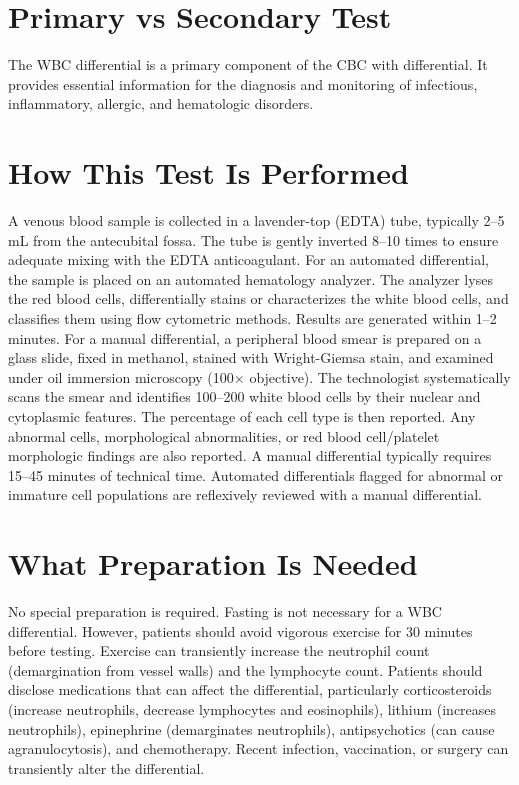 \section*{Primary vs Secondary Test}
The WBC differential is a primary component of the CBC with differential. It provides essential information for the diagnosis and monitoring of infectious, inflammatory, allergic, and hematologic disorders.

\section*{How This Test Is Performed}
A venous blood sample is collected in a lavender-top (EDTA) tube, typically 2--5 mL from the antecubital fossa. The tube is gently inverted 8--10 times to ensure adequate mixing with the EDTA anticoagulant. For an automated differential, the sample is placed on an automated hematology analyzer. The analyzer lyses the red blood cells, differentially stains or characterizes the white blood cells, and classifies them using flow cytometric methods. Results are generated within 1--2 minutes. For a manual differential, a peripheral blood smear is prepared on a glass slide, fixed in methanol, stained with Wright-Giemsa stain, and examined under oil immersion microscopy (100$\times$ objective). The technologist systematically scans the smear and identifies 100--200 white blood cells by their nuclear and cytoplasmic features. The percentage of each cell type is then reported. Any abnormal cells, morphological abnormalities, or red blood cell/platelet morphologic findings are also reported. A manual differential typically requires 15--45 minutes of technical time. Automated differentials flagged for abnormal or immature cell populations are reflexively reviewed with a manual differential.

\section*{What Preparation Is Needed}
No special preparation is required. Fasting is not necessary for a WBC differential. However, patients should avoid vigorous exercise for 30 minutes before testing. Exercise can transiently increase the neutrophil count (demargination from vessel walls) and the lymphocyte count. Patients should disclose medications that can affect the differential, particularly corticosteroids (increase neutrophils, decrease lymphocytes and eosinophils), lithium (increases neutrophils), epinephrine (demarginates neutrophils), antipsychotics (can cause agranulocytosis), and chemotherapy. Recent infection, vaccination, or surgery can transiently alter the differential.

